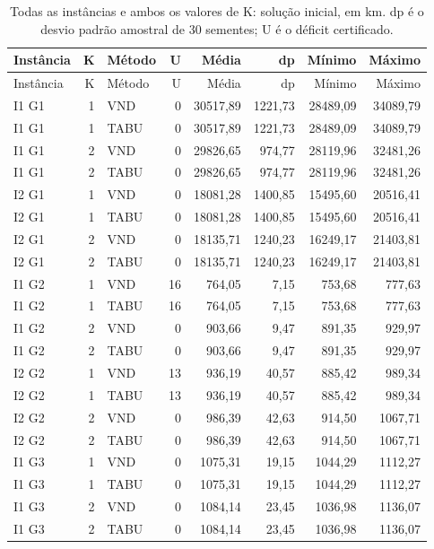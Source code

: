 \scriptsize
\setlength{\tabcolsep}{3pt}
\begin{longtable}{lrlrrrrr}
\caption{Todas as instâncias e ambos os valores de K: solução inicial, em km. dp é o desvio padrão amostral de 30 sementes; U é o déficit certificado.}\\
\toprule Instância & K & Método & U & Média & dp & Mínimo & Máximo\\\midrule\endfirsthead
\toprule Instância & K & Método & U & Média & dp & Mínimo & Máximo\\\midrule\endhead
I1 G1 & 1 & VND & 0 & 30517,89 & 1221,73 & 28489,09 & 34089,79 \\
I1 G1 & 1 & TABU & 0 & 30517,89 & 1221,73 & 28489,09 & 34089,79 \\
I1 G1 & 2 & VND & 0 & 29826,65 & 974,77 & 28119,96 & 32481,26 \\
I1 G1 & 2 & TABU & 0 & 29826,65 & 974,77 & 28119,96 & 32481,26 \\
I2 G1 & 1 & VND & 0 & 18081,28 & 1400,85 & 15495,60 & 20516,41 \\
I2 G1 & 1 & TABU & 0 & 18081,28 & 1400,85 & 15495,60 & 20516,41 \\
I2 G1 & 2 & VND & 0 & 18135,71 & 1240,23 & 16249,17 & 21403,81 \\
I2 G1 & 2 & TABU & 0 & 18135,71 & 1240,23 & 16249,17 & 21403,81 \\
I1 G2 & 1 & VND & 16 & 764,05 & 7,15 & 753,68 & 777,63 \\
I1 G2 & 1 & TABU & 16 & 764,05 & 7,15 & 753,68 & 777,63 \\
I1 G2 & 2 & VND & 0 & 903,66 & 9,47 & 891,35 & 929,97 \\
I1 G2 & 2 & TABU & 0 & 903,66 & 9,47 & 891,35 & 929,97 \\
I2 G2 & 1 & VND & 13 & 936,19 & 40,57 & 885,42 & 989,34 \\
I2 G2 & 1 & TABU & 13 & 936,19 & 40,57 & 885,42 & 989,34 \\
I2 G2 & 2 & VND & 0 & 986,39 & 42,63 & 914,50 & 1067,71 \\
I2 G2 & 2 & TABU & 0 & 986,39 & 42,63 & 914,50 & 1067,71 \\
I1 G3 & 1 & VND & 0 & 1075,31 & 19,15 & 1044,29 & 1112,27 \\
I1 G3 & 1 & TABU & 0 & 1075,31 & 19,15 & 1044,29 & 1112,27 \\
I1 G3 & 2 & VND & 0 & 1084,14 & 23,45 & 1036,98 & 1136,07 \\
I1 G3 & 2 & TABU & 0 & 1084,14 & 23,45 & 1036,98 & 1136,07 \\

\end{longtable}
